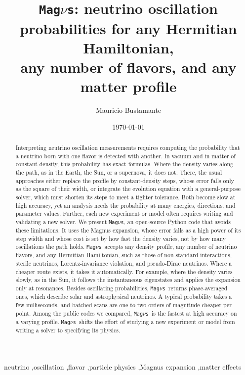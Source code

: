 \documentclass[final,5p,times,twocolumn,sort,compress]{elsarticle}
\makeatletter
\DeclareRobustCommand{\_}{%
  \ifmmode\nfss@text{\textunderscore}\else\textunderscore\allowbreak\fi}
\newcommand{\magnus}{{\tt Mag}\ensuremath{\nu}{\tt s}}
\makeatother
\begin{document}
\begin{frontmatter}

\title{\magnus: neutrino oscillation probabilities for any Hermitian Hamiltonian,\\any number of flavors, and any matter profile}

\author{Mauricio Bustamante}
\address{Niels Bohr International Academy, Niels Bohr Institute,\\University of Copenhagen, DK-2100 Copenhagen, Denmark}

\date{\today}

\begin{abstract}
Interpreting neutrino oscillation measurements requires computing the probability that a neutrino born with one flavor is detected with another. In vacuum and in matter of constant density, this probability has exact formulas. Where the density varies along the path, as in the Earth, the Sun, or a supernova, it does not. There, the usual approaches either replace the profile by constant-density steps, whose error falls only as the square of their width, or integrate the evolution equation with a general-purpose solver, which must shorten its steps to meet a tighter tolerance. Both become slow at high accuracy, yet an analysis needs the probability at many energies, directions, and parameter values. Further, each new experiment or model often requires writing and validating a new solver. We present \magnus, an open-source Python code that avoids these limitations. It uses the Magnus expansion, whose error falls as a high power of its step width and whose cost is set by how fast the density varies, not by how many oscillations the path holds. \magnus\ accepts any density profile, any number of neutrino flavors, and any Hermitian Hamiltonian, such as those of non-standard interactions, sterile neutrinos, Lorentz-invariance violation, and pseudo-Dirac neutrinos.  Where a cheaper route exists, it takes it automatically. For example, where the density varies slowly, as in the Sun, it follows the instantaneous eigenstates and applies the expansion only at resonances. Besides oscillating probabilities, \magnus\ returns phase-averaged ones, which describe solar and astrophysical neutrinos. A typical probability takes a few milliseconds, and batched scans are one to two orders of magnitude cheaper per point. Among the public codes we compared, \magnus\ is the fastest at high accuracy on a varying profile. \magnus\ shifts the effort of studying a new experiment or model from writing a solver to specifying its physics. 
\end{abstract}

\begin{keyword}

neutrino \sep oscillation \sep flavor \sep particle physics \sep Magnus expansion \sep matter effects

\end{keyword}

\end{frontmatter}
\end{document}

